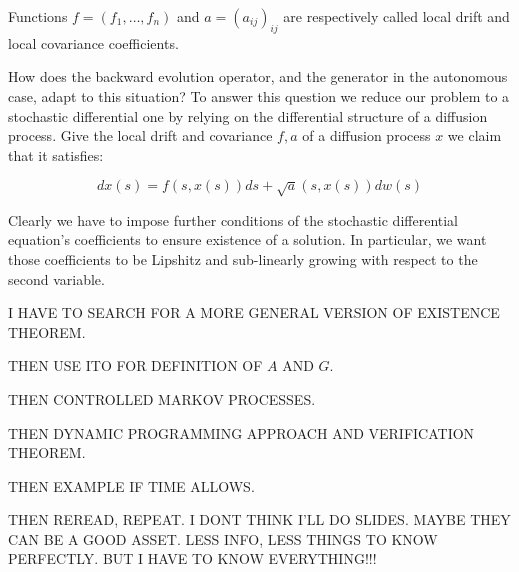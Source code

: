 Functions $f=(f_1,\dots,f_n)$ and $a=(a_{ij})_{ij}$ are respectively called local drift and local covariance coefficients.

How does the backward evolution operator, and the generator in the autonomous case, adapt to this situation? 
To answer this question we reduce our problem to a stochastic differential one by relying on the differential structure of a diffusion process. 
Give the local drift and covariance $f,a$ of a diffusion process $x$ we claim that it satisfies:

\begin{equation}\label{2-1-SDEdef}
    dx(s) = f(s,x(s))ds + \sqrt{a}(s,x(s))dw(s) 
\end{equation}

Clearly we have to impose further conditions of the stochastic differential equation's coefficients to ensure existence of a solution. 
In particular, we want those coefficients to be Lipshitz and sub-linearly growing with respect to the second variable.

I HAVE TO SEARCH FOR A MORE GENERAL VERSION OF EXISTENCE THEOREM.

THEN USE ITO FOR DEFINITION OF $A$ AND $G$. 

THEN CONTROLLED MARKOV PROCESSES.

THEN DYNAMIC PROGRAMMING APPROACH AND VERIFICATION THEOREM.

THEN EXAMPLE IF TIME ALLOWS.

THEN REREAD, REPEAT. I DONT THINK I'LL DO SLIDES. MAYBE THEY CAN BE A GOOD ASSET. LESS INFO, LESS THINGS TO KNOW PERFECTLY. BUT I HAVE TO KNOW EVERYTHING!!!